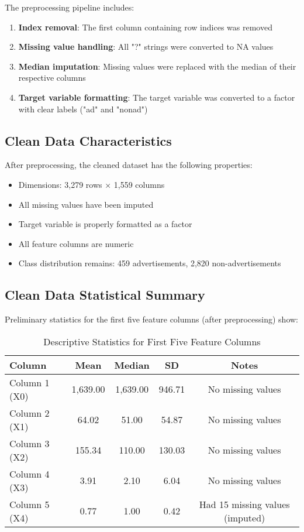 The preprocessing pipeline includes:
\begin{enumerate}
    \item \textbf{Index removal}: The first column containing row indices was removed
    \item \textbf{Missing value handling}: All "?" strings were converted to NA values
    \item \textbf{Median imputation}: Missing values were replaced with the median of their respective columns
    \item \textbf{Target variable formatting}: The target variable was converted to a factor with clear labels ("ad" and "nonad")
\end{enumerate}

\subsection{Clean Data Characteristics}
After preprocessing, the cleaned dataset has the following properties:
\begin{itemize}
    \item Dimensions: 3,279 rows × 1,559 columns
    \item All missing values have been imputed
    \item Target variable is properly formatted as a factor
    \item All feature columns are numeric
    \item Class distribution remains: 459 advertisements, 2,820 non-advertisements
\end{itemize}

\subsection{Clean Data Statistical Summary}
Preliminary statistics for the first five feature columns (after preprocessing) show:

\begin{table}[h]
\centering
\caption{Descriptive Statistics for First Five Feature Columns}
\label{tab:basic_stats}
\begin{tabular}{|l|c|c|c|c|}
\hline
\textbf{Column} & \textbf{Mean} & \textbf{Median} & \textbf{SD} & \textbf{Notes} \\
\hline
Column 1 (X0) & 1,639.00 & 1,639.00 & 946.71 & No missing values \\
Column 2 (X1) & 64.02 & 51.00 & 54.87 & No missing values \\
Column 3 (X2) & 155.34 & 110.00 & 130.03 & No missing values \\
Column 4 (X3) & 3.91 & 2.10 & 6.04 & No missing values \\
Column 5 (X4) & 0.77 & 1.00 & 0.42 & Had 15 missing values (imputed) \\
\hline
\end{tabular}
\end{table}

